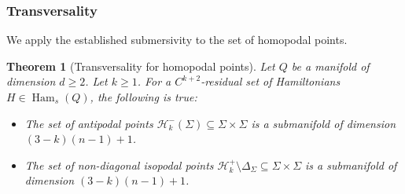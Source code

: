 \documentclass{amsart}
\newcommand{\Hcal}{{\mathcal{H}}}
\newcommand{\Ham}{\operatorname{Ham}}
\newtheorem{theorem}{Theorem}
\theoremstyle{definition}
\theoremstyle{remark}
\numberwithin{equation}{section}
\begin{document}

\subsubsection{Transversality}

We apply the established submersivity to the set of homopodal points. 

\begin{theorem}[Transversality for homopodal points]\label{thm:homopodaltransversality}
    Let $Q$ be a manifold of dimension $d\geq 2$. Let $k\geq 1$. For a $C^{k+2}$-residual set of Hamiltonians $H\in \Ham_s(Q)$, the following is true:
    \begin{itemize}
        \item The set of antipodal points $\Hcal^-_k(\Sigma)\subseteq \Sigma\times\Sigma$ is a submanifold of dimension $(3-k)(n-1)+1$.
        \item The set of non-diagonal isopodal points $\Hcal^+_k\setminus \Delta_\Sigma\subseteq \Sigma\times\Sigma$ is a submanifold of dimension $(3-k)(n-1)+1$. 
    \end{itemize}
\end{theorem}
\end{document}
